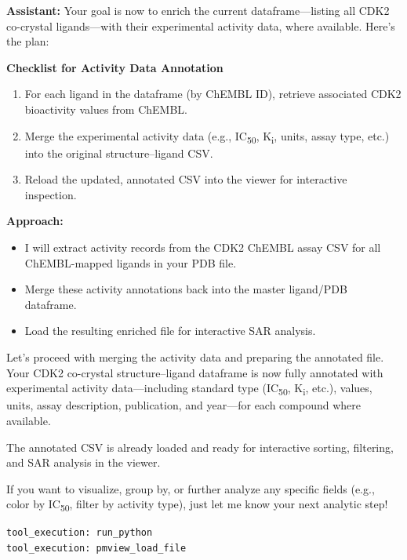 \documentclass{article}
\begin{document}
\begin{assistantbox}
\textbf{Assistant:} Your goal is now to enrich the current dataframe—listing all CDK2 co-crystal ligands—with their experimental activity data, where available. Here's the plan:

\textbf{Checklist for Activity Data Annotation}
\begin{enumerate}[label=\arabic*.]
    \item For each ligand in the dataframe (by ChEMBL ID), retrieve associated CDK2 bioactivity values from ChEMBL.
    \item Merge the experimental activity data (e.g., IC\textsubscript{50}, K\textsubscript{i}, units, assay type, etc.) into the original structure–ligand CSV.
    \item Reload the updated, annotated CSV into the viewer for interactive inspection.
\end{enumerate}

\textbf{Approach:}
\begin{itemize}
    \item I will extract activity records from the CDK2 ChEMBL assay CSV for all ChEMBL-mapped ligands in your PDB file.
    \item Merge these activity annotations back into the master ligand/PDB dataframe.
    \item Load the resulting enriched file for interactive SAR analysis.
\end{itemize}

Let's proceed with merging the activity data and preparing the annotated file. Your CDK2 co-crystal structure–ligand dataframe is now fully annotated with experimental activity data—including standard type (IC\textsubscript{50}, K\textsubscript{i}, etc.), values, units, assay description, publication, and year—for each compound where available.

The annotated CSV is already loaded and ready for interactive sorting, filtering, and SAR analysis in the viewer.

If you want to visualize, group by, or further analyze any specific fields (e.g., color by IC\textsubscript{50}, filter by activity type), just let me know your next analytic step!
\begin{verbatim}
tool_execution: run_python
tool_execution: pmview_load_file
\end{verbatim}
\end{assistantbox}

\vspace{1.5em}
\end{document}
